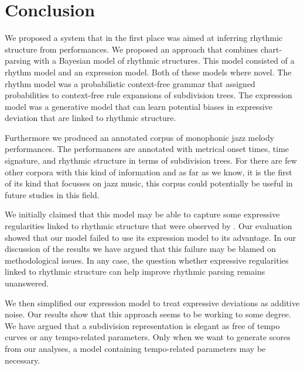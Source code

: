 \chapter{Conclusion}
\label{sec:conclusion}


We proposed a system that in the first place was aimed at inferring rhythmic structure from performances. We proposed an approach that combines chart-parsing with a Bayesian model of rhythmic structures. This model consisted of a rhythm model and an expression model. Both of these models where novel. The rhythm model was a probabilistic context-free grammar that assigned probabilities to context-free rule expansions of subdivision trees. The expression model was a generative model that can learn potential biases in expressive deviation that are linked to rhythmic structure.

Furthermore we produced an annotated corpus of monophonic jazz melody performances. The performances are annotated with metrical onset times, time signature, and rhythmic structure in terms of subdivision trees. For there are few other corpora with this kind of information and as far as we know, it is the first of its kind that focusses on jazz music, this corpus could potentially be useful in future studies in this field. 

We initially claimed that this model may be able to capture some expressive regularities linked to rhythmic structure that were observed by \citet{bengtsson1983analysis}. Our evaluation showed that our model failed to use its expression model to its advantage. In our discussion of the results we have argued that this failure may be blamed on methodological issues. In any case, the question whether expressive regularities linked to rhythmic structure can help improve rhythmic parsing remains unanswered. 

We then simplified our expression model to treat expressive deviations as additive noise. Our results show that this approach seems to be working to some degree. We have argued that a subdivision representation is elegant as free of tempo curves or any tempo-related parameters. Only when we want to generate scores from our analyses, a model containing tempo-related parameters may be necessary.
